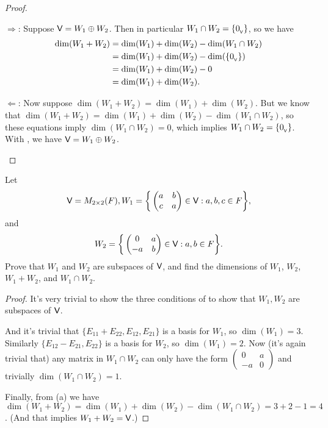 \begin{proof}
\begin{enumerate}
\(\Longrightarrow\):
Suppose \(\textsf{V} = W_1 \oplus W_2\).
Then in particular \(W_1 \cap W_2 = \{ 0_{_{\textsf{V}}} \}\), so we have
\begin{align*}
    \dim(W_1 + W_2) & = \dim(W_1) + \dim(W_2) - \dim(W_1 \cap W_2) \\
                    & = \dim(W_1) + \dim(W_2) - \dim(\{ 0_{_{\textsf{V}}} \}) \\
                    & = \dim(W_1) + \dim(W_2) - 0 \\
                    & = \dim(W_1) + \dim(W_2).
\end{align*}

\(\Longleftarrow\):
Now suppose \(\dim(W_1 + W_2) = \dim(W_1) + \dim(W_2)\).
But we know that \(\dim(W_1 + W_2) = \dim(W_1) + \dim(W_2) - \dim(W_1 \cap W_2)\), so these equations imply \(\dim(W_1 \cap W_2) = 0\), which implies \(W_1 \cap W_2 = \{ 0_{_{\textsf{V}}} \}\).
With , we have \(\textsf{V} = W_1 \oplus W_2\).
\end{enumerate}
\end{proof}

\begin{exercise} \label{exercise 1.6.30}
Let
\[
    \textsf{V} = M_{2 \times 2}(F),
    W_1 = \bigg\{
        \begin{pmatrix}
            a & b \\
            c & a
        \end{pmatrix}
        \in \textsf{V}: a, b, c \in F
        \bigg\},
\]
and
\[
    W_2 = \bigg\{
        \begin{pmatrix}
            0 & a \\
            -a & b
        \end{pmatrix}
        \in \textsf{V}: a, b \in F
        \bigg\}.
\]
Prove that \(W_1\) and \(W_2\) are subspaces of \(\textsf{V}\), and find the dimensions of \(W_1\), \(W_2\), \(W_1 + W_2\), and \(W_1 \cap W_2\).
\end{exercise}

\begin{proof}
It's very trivial to show the three conditions of  to show that \(W_1, W_2\) are subspaces of \(\textsf{V}\).

And it's trivial that \(\{ E_{11} + E_{22}, E_{12}, E_{21} \}\) is a basis for \(W_1\), so \(\dim(W_1) = 3\).
Similarly \(\{ E_{12} - E_{21}, E_{22} \}\) is a basis for \(W_2\), so \(\dim(W_1) = 2\).
Now (it's again trivial that) any matrix in \(W_1 \cap W_2\) can only have the form
\(\begin{pmatrix}
    0 & a \\
    -a & 0
\end{pmatrix}\)
and trivially \(\dim(W_1 \cap W_2) = 1\).

Finally, from (a) we have \(\dim(W_1 + W_2) = \dim(W_1) + \dim(W_2) - \dim(W_1 \cap W_2) = 3 + 2 - 1 = 4\).
(And that implies \(W_1 + W_2 = \textsf{V}\).)
\end{proof}

